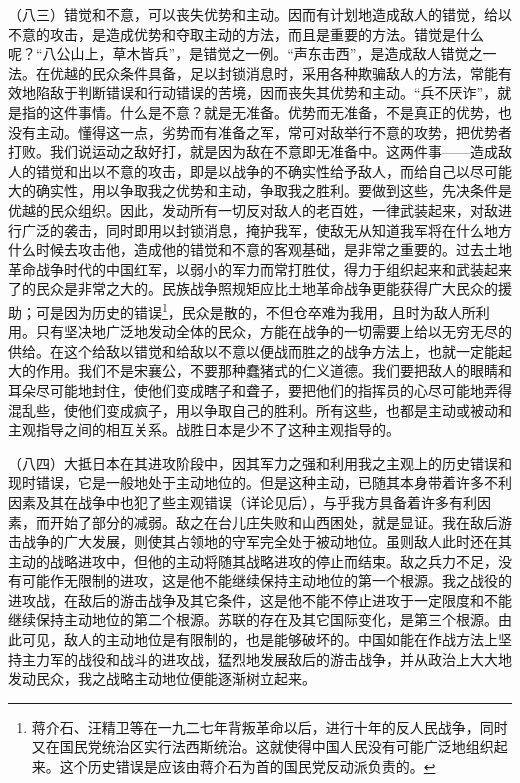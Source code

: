 \documentclass[UTF8, 12pt, a4paper]{ctexrep}
\begin{document}
（八三）错觉和不意，可以丧失优势和主动。因而有计划地造成敌人的错觉，给以不意的攻击，是造成优势和夺取主动的方法，而且是重要的方法。错觉是什么呢？“八公山上，草木皆兵”，是错觉之一例。“声东击西”，是造成敌人错觉之一法。在优越的民众条件具备，足以封锁消息时，采用各种欺骗敌人的方法，常能有效地陷敌于判断错误和行动错误的苦境，因而丧失其优势和主动。“兵不厌诈”，就是指的这件事情。什么是不意？就是无准备。优势而无准备，不是真正的优势，也没有主动。懂得这一点，劣势而有准备之军，常可对敌举行不意的攻势，把优势者打败。我们说运动之敌好打，就是因为敌在不意即无准备中。这两件事——造成敌人的错觉和出以不意的攻击，即是以战争的不确实性给予敌人，而给自己以尽可能大的确实性，用以争取我之优势和主动，争取我之胜利。要做到这些，先决条件是优越的民众组织。因此，发动所有一切反对敌人的老百姓，一律武装起来，对敌进行广泛的袭击，同时即用以封锁消息，掩护我军，使敌无从知道我军将在什么地方什么时候去攻击他，造成他的错觉和不意的客观基础，是非常之重要的。过去土地革命战争时代的中国红军，以弱小的军力而常打胜仗，得力于组织起来和武装起来了的民众是非常之大的。民族战争照规矩应比土地革命战争更能获得广大民众的援助；可是因为历史的错误\footnote{蒋介石、汪精卫等在一九二七年背叛革命以后，进行十年的反人民战争，同时又在国民党统治区实行法西斯统治。这就使得中国人民没有可能广泛地组织起来。这个历史错误是应该由蒋介石为首的国民党反动派负责的。}，民众是散的，不但仓卒难为我用，且时为敌人所利用。只有坚决地广泛地发动全体的民众，方能在战争的一切需要上给以无穷无尽的供给。在这个给敌以错觉和给敌以不意以便战而胜之的战争方法上，也就一定能起大的作用。我们不是宋襄公，不要那种蠢猪式的仁义道德。我们要把敌人的眼睛和耳朵尽可能地封住，使他们变成瞎子和聋子，要把他们的指挥员的心尽可能地弄得混乱些，使他们变成疯子，用以争取自己的胜利。所有这些，也都是主动或被动和主观指导之间的相互关系。战胜日本是少不了这种主观指导的。

（八四）大抵日本在其进攻阶段中，因其军力之强和利用我之主观上的历史错误和现时错误，它是一般地处于主动地位的。但是这种主动，已随其本身带着许多不利因素及其在战争中也犯了些主观错误（详论见后），与乎我方具备着许多有利因素，而开始了部分的减弱。敌之在台儿庄失败和山西困处，就是显证。我在敌后游击战争的广大发展，则使其占领地的守军完全处于被动地位。虽则敌人此时还在其主动的战略进攻中，但他的主动将随其战略进攻的停止而结束。敌之兵力不足，没有可能作无限制的进攻，这是他不能继续保持主动地位的第一个根源。我之战役的进攻战，在敌后的游击战争及其它条件，这是他不能不停止进攻于一定限度和不能继续保持主动地位的第二个根源。苏联的存在及其它国际变化，是第三个根源。由此可见，敌人的主动地位是有限制的，也是能够破坏的。中国如能在作战方法上坚持主力军的战役和战斗的进攻战，猛烈地发展敌后的游击战争，并从政治上大大地发动民众，我之战略主动地位便能逐渐树立起来。
\end{document}
